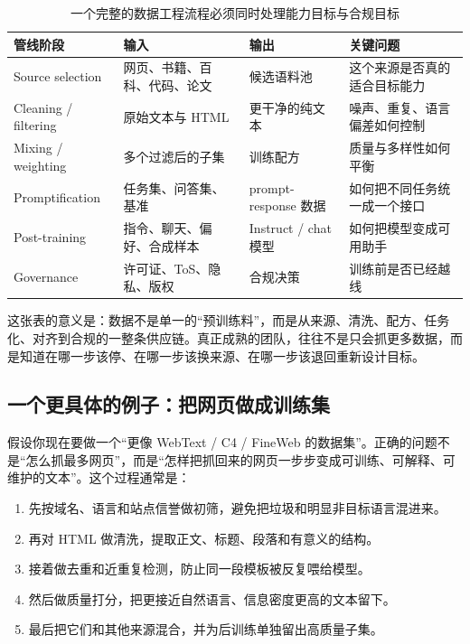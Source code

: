 \begin{table}[H]
\centering
\begin{tabular}{p{}p{}p{}p{}}
\toprule
\textbf{管线阶段} & \textbf{输入} & \textbf{输出} & \textbf{关键问题} \\
\midrule
Source selection & 网页、书籍、百科、代码、论文 & 候选语料池 & 这个来源是否真的适合目标能力 \\
Cleaning / filtering & 原始文本与 HTML & 更干净的纯文本 & 噪声、重复、语言偏差如何控制 \\
Mixing / weighting & 多个过滤后的子集 & 训练配方 & 质量与多样性如何平衡 \\
Promptification & 任务集、问答集、基准 & prompt-response 数据 & 如何把不同任务统一成一个接口 \\
Post-training & 指令、聊天、偏好、合成样本 & Instruct / chat 模型 & 如何把模型变成可用助手 \\
Governance & 许可证、ToS、隐私、版权 & 合规决策 & 训练前是否已经越线 \\
\bottomrule
\end{tabular}
\caption{一个完整的数据工程流程必须同时处理能力目标与合规目标}
\end{table}

这张表的意义是：数据不是单一的“预训练料”，而是从来源、清洗、配方、任务化、对齐到合规的一整条供应链。真正成熟的团队，往往不是只会抓更多数据，而是知道在哪一步该停、在哪一步该换来源、在哪一步该退回重新设计目标。

\subsection{一个更具体的例子：把网页做成训练集}

假设你现在要做一个“更像 WebText / C4 / FineWeb 的数据集”。正确的问题不是“怎么抓最多网页”，而是“怎样把抓回来的网页一步步变成可训练、可解释、可维护的文本”。这个过程通常是：
\begin{enumerate}
    \item 先按域名、语言和站点信誉做初筛，避免把垃圾和明显非目标语言混进来。
    \item 再对 HTML 做清洗，提取正文、标题、段落和有意义的结构。
    \item 接着做去重和近重复检测，防止同一段模板被反复喂给模型。
    \item 然后做质量打分，把更接近自然语言、信息密度更高的文本留下。
    \item 最后把它们和其他来源混合，并为后训练单独留出高质量子集。
\end{enumerate}

